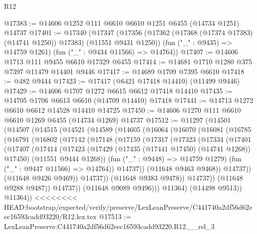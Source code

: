 \begin{lexlean}{R12}
\begin{coremodule}
{{{{{{{{{{{{{{{{{{{{{{{{{{{{{{{{{{{{{{{{{{{{{{{{{{{{{{{{{{{{{{{{{{{{{{{{{{{{{{{{{{@17383 := @14606 @1252 @111 @6610 @6610 @1251 @6455 (@14734 @1251) @14737
@17401 := @17340
    (@17347
      (@17356 (@17362 (@17368 (@17374 @17383) (@14741 @1250)) @17383) (@11551 @9431 @1250))
      (fun ("_" : @9435) => @14759 @1261)
      (fun ("_" : @9434 @11566) => @14764))
@17407 := @14606 @1713 @111 @9455 @6610 @17329 @6455
@17414 := @14681 @1710 @1280 @375 @7397 @11479 @14401 @9446
@17417 := @14689 @1709 @7395 @6610
@17418 := @482 @9444
@17423 := @17417 (@6421 @17418 @14410) (@11499 @9446)
@17429 := @14606 @1707 @1272 @6615 @6612 @17418 @14410
@17435 := @14705 @1706 @6613 @6610 (@14709 @14410) @17418
@17441 := @14713 @1272 @6610 @6612 @14528 @14410 @14725
@17450 := @14606 @1270 @111 @6610 @6610 @1269 @6455 (@14734 @1269) @14737
@17512 := @11297
    (@14501
      (@14507
        (@14515
          (@14521
            (@14589
              (@14605
                (@16064
                  (@16070
                    (@16081
                      (@16785
                        (@16791
                          (@16802
                            (@17142
                              (@17148
                                (@17159
                                  (@17317
                                    (@17323
                                      (@17334
                                        (@17401
                                          (@17407
                                            (@17414
                                              (@17423
                                                (@17429
                                                  (@17435 (@17441 @17450) (@14741 @1268))
                                                  @17450)
                                                (@11551 @9444 @1268))
                                              (fun ("_" : @9448) => @14759 @1279)
                                              (fun ("_" : @9447 @11566) => @14764))
                                            @14737))
                                        (@11648 @9463 @9468))
                                      @14737))
                                  (@11648 @9426 @9469))
                                @14737))
                            (@11648 @9383 @9478))
                          @14737))
                      (@11648 @9288 @9487))
                    @14737))
                (@11648 @9089 @9496)))
            @11364)
          (@14498 @9513))
        @11364))
<<<<<<<< HEAD:bootstrap/expected/verify/preserve/LexLeanPreserve/C441740a2df56d62eec16593cadd93220/R12.lex.tex
@17513 := LexLeanPreserve.C441740a2df56d62eec16593cadd93220.R12.__rel_3
}}}}}}}}}}}}}}}}}}}}}}}}}}}}}}}}}}}}}}}}}}}}}}}}}}}}}}}}}}}}}}}}}}}}}}}}}}}}}}}}}}
\end{coremodule}
\end{lexlean}
